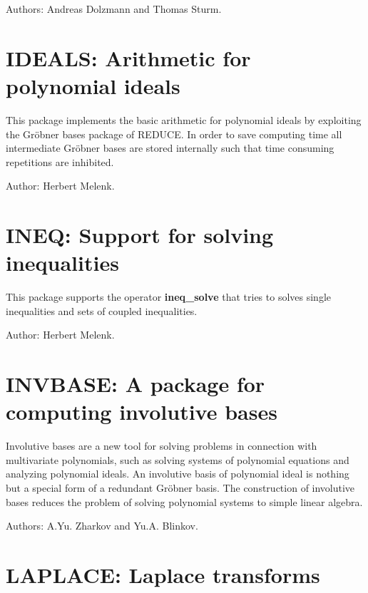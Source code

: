 Authors: Andreas Dolzmann and Thomas Sturm.


\newpage

\section{IDEALS: Arithmetic for polynomial ideals} 

This package implements the basic arithmetic for polynomial ideals by
exploiting the Gr\"obner bases package of REDUCE.  In order to save
computing time all intermediate Gr\"obner bases are stored internally such
that time consuming repetitions are inhibited.

Author: Herbert Melenk.


\newpage

\section{INEQ: Support for solving inequalities} 

This package supports the operator {\bf ineq\_solve} that 
tries to solves single inequalities and sets of coupled inequalities.

Author: Herbert Melenk.


\newpage

\section{INVBASE: A package for computing involutive bases} 

Involutive bases are a new tool for solving problems in connection with
multivariate polynomials, such as solving systems of polynomial equations
and analyzing polynomial ideals.  An involutive basis of polynomial ideal
is nothing but a special form of a redundant Gr\"obner basis.  The
construction of involutive bases reduces the problem of solving polynomial
systems to simple linear algebra.

Authors: A.Yu. Zharkov and Yu.A. Blinkov.


\newpage

\section{LAPLACE: Laplace transforms} 


